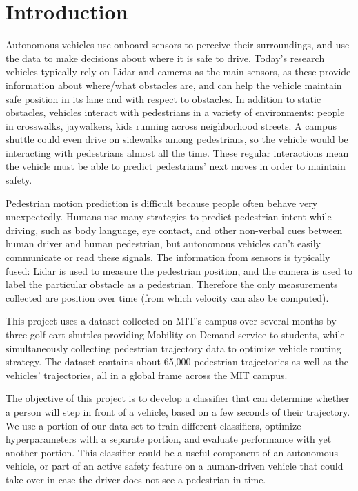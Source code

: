 
\section{Introduction} \label{sec:intro}

Autonomous vehicles use onboard sensors to perceive their surroundings, and use the data to make decisions about where it is safe to drive.
Today's research vehicles typically rely on Lidar and cameras as the main sensors, as these provide information about where/what obstacles are, and can help the vehicle maintain safe position in its lane and with respect to obstacles.
In addition to static obstacles, vehicles interact with pedestrians in a variety of environments: people in crosswalks, jaywalkers, kids running across neighborhood streets.
A campus shuttle could even drive on sidewalks among pedestrians, so the vehicle would be interacting with pedestrians almost all the time.
These regular interactions mean the vehicle must be able to predict pedestrians' next moves in order to maintain safety.

Pedestrian motion prediction is difficult because people often behave very unexpectedly.
Humans use many strategies to predict pedestrian intent while driving, such as body language, eye contact, and other non-verbal cues between human driver and human pedestrian, but autonomous vehicles can't easily communicate or read these signals.
The information from sensors is typically fused: Lidar is used to measure the pedestrian position, and the camera is used to label the particular obstacle as a pedestrian.
Therefore the only measurements collected are position over time (from which velocity can also be computed).

This project uses a dataset collected on MIT's campus over several months by three golf cart shuttles providing Mobility on Demand service to students, while simultaneously collecting pedestrian trajectory data to optimize vehicle routing strategy.
The dataset contains about 65,000 pedestrian trajectories as well as the vehicles' trajectories, all in a global frame across the MIT campus.


The objective of this project is to develop a classifier that can determine whether a person will step in front of a vehicle, based on a few seconds of their trajectory.
We use a portion of our data set to train different classifiers, optimize hyperparameters with a separate portion, and evaluate performance with yet another portion.
This classifier could be a useful component of an autonomous vehicle, or part of an active safety feature on a human-driven vehicle that could take over in case the driver does not see a pedestrian in time.

